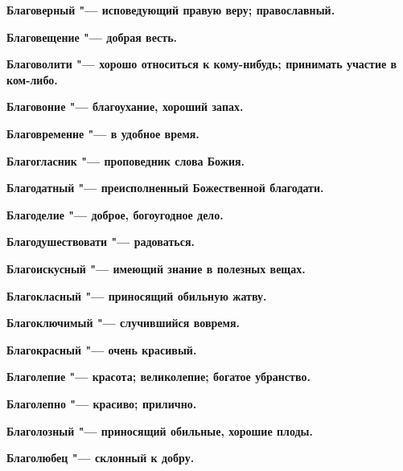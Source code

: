 \bfseries Благоверный \normalfont{} "--- исповедующий правую веру; православный. 




\bfseries Благовещение \normalfont{} "--- добрая весть. 




\bfseries Благоволити \normalfont{} "--- хорошо относиться к кому-нибудь; принимать участие в ком-либо. 




\bfseries Благовоние \normalfont{} "--- благоухание, хороший запах. 




\bfseries Благовременне \normalfont{} "--- в удобное время. 




\bfseries Благогласник \normalfont{} "--- проповедник слова Божия. 




\bfseries Благодатный \normalfont{} "--- преисполненный Божественной благодати. 




\bfseries Благоделие \normalfont{} "--- доброе, богоугодное дело. 




\bfseries Благодушествовати \normalfont{} "--- радоваться. 




\bfseries Благоискусный \normalfont{} "--- имеющий знание в полезных вещах. 




\bfseries Благокласный \normalfont{} "--- приносящий обильную жатву. 




\bfseries Благоключимый \normalfont{} "--- случившийся вовремя. 




\bfseries Благокрасный \normalfont{} "--- очень красивый. 




\bfseries Благолепие \normalfont{} "--- красота; великолепие; богатое убранство. 




\bfseries Благолепно \normalfont{} "--- красиво; прилично. 




\bfseries Благолозный \normalfont{} "--- приносящий обильные, хорошие плоды. 




\bfseries Благолюбец \normalfont{} "--- склонный к добру. 




